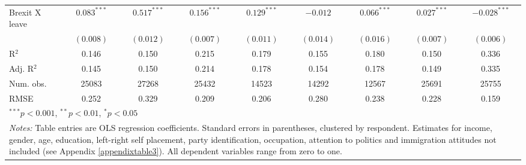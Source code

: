 \documentclass[12pt, letter]{article}
\begin{document}
\begin{table}[t]
\begin{center}
{\begin{tabular}{l c c c c c c c c }
                                 Brexit X leave                   & $0.083^{***}$  & $0.517^{***}$  & $0.156^{***}$  & $0.129^{***}$  & $-0.012$       & $0.066^{***}$  & $0.027^{***}$  & $-0.028^{***}$ \\
                                 & $(0.008)$      & $(0.012)$      & $(0.007)$      & $(0.011)$      & $(0.014)$      & $(0.016)$      & $(0.007)$      & $(0.006)$      \\
\hline
R$^2$                            & 0.146          & 0.150          & 0.215          & 0.179          & 0.155          & 0.180          & 0.150          & 0.336          \\
Adj. R$^2$                       & 0.145          & 0.150          & 0.214          & 0.178          & 0.154          & 0.178          & 0.149          & 0.335          \\
Num. obs.                        & 25083          & 27268          & 25432          & 14523          & 14292          & 12567          & 25691          & 25755          \\
RMSE                             & 0.252          & 0.329          & 0.209          & 0.206          & 0.280          & 0.238          & 0.228          & 0.159          \\
\toprule[1.5pt]
\multicolumn{9}{l}{\scriptsize{$^{***}p<0.001$, $^{**}p<0.01$, $^*p<0.05$}} \\
\multicolumn{9}{l}{\multirow{3}{650pt}{\footnotesize{\textit{Notes:} Table entries are OLS regression coefficients. Standard errors in parentheses, clustered by respondent. Estimates for income, gender, age, education, left-right self placement, party identification, occupation, attention to politics and immigration attitudes not included (see Appendix \ref{appendixtable3}). All dependent variables range from zero to one.}}} \\
\end{tabular}}
\label{table:6month}
\end{center}
\end{table}
\end{document}
